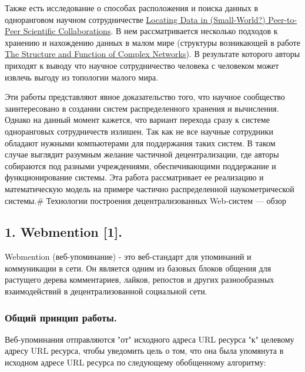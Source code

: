 Также есть исследование о способах расположения и поиска данных в
одноранговом научном сотрудничестве
\href{https://arxiv.org/pdf/cs/0209031.pdf}{Locating Data in
(Small-World?) Peer-to-Peer Scientific Collaborations}. В нем
рассматривается несколько подходов к хранению и нахождению данных в
малом мире (структуры возникающей в работе
\href{https://epubs.siam.org/doi/pdf/10.1137/S003614450342480?xid=PS_smithsonian}{The
Structure and Function of Complex Networks}). В результате которого
авторы приходят к выводу что научное сотрудничество человека с человеком
может извлечь выгоду из топологии малого мира.

Эти работы представляют явное доказательство того, что научное
сообщество заинтересовано в создании систем распределенного хранения и
вычисления. Однако на данный момент кажется, что вариант перехода сразу
к системе одноранговых сотрудничеств излишен. Так как не все научные
сотрудники обладают нужными компьютерами для поддержания таких систем. В
таком случае выглядит разумным желание частичной децентрализации, где
авторы собираются под разными учреждениями, обеспечивающими поддержание
и функционирование системы. Эта работа рассматривает ее реализацию и
математическую модель на примере частично распределенной
наукометрической системы.\# Технологии построения децентрализованных
Web-систем --- обзор

\hypertarget{1-webmention-1}{%
\subsection{1. Webmention {[}1{]}.}\label{1-webmention-1}}

Webmention (веб-упоминание) - это веб-стандарт для упоминаний и
коммуникации в сети. Он является одним из базовых блоков общения для
растущего дерева комментариев, лайков, репостов и других разнообразных
взаимодействий в децентрализованной социальной сети.

\hypertarget{ux43eux431ux449ux438ux439-ux43fux440ux438ux43dux446ux438ux43f-ux440ux430ux431ux43eux442ux44b}{%
\subsubsection{Общий принцип
работы.}\label{ux43eux431ux449ux438ux439-ux43fux440ux438ux43dux446ux438ux43f-ux440ux430ux431ux43eux442ux44b}}

Веб-упоминания отправляются "от" исходного адреса URL ресурса "к"
целевому адресу URL ресурса, чтобы уведомить цель о том, что она была
упомянута в исходном адресе URL ресурса по следующему обобщенному
алгоритму:

